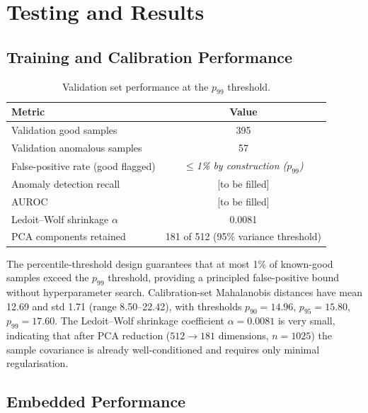 \section{Testing and Results}

\subsection{Training and Calibration Performance}

\begin{table}[h]
\centering
\caption{Validation set performance at the $p_{99}$ threshold.}
\label{tab:val}
\small
\begin{tabular}{lc}
\hline
\textbf{Metric} & \textbf{Value} \\
\hline
Validation good samples       & 395 \\
Validation anomalous samples  & 57 \\
False-positive rate (good flagged) & \textit{$\leq$1\% by construction ($p_{99}$)} \\
Anomaly detection recall      & [to be filled] \\
AUROC                         & [to be filled] \\
Ledoit--Wolf shrinkage $\alpha$ & 0.0081 \\
PCA components retained       & 181 of 512 (95\% variance threshold) \\
\hline
\end{tabular}
\end{table}

The percentile-threshold design guarantees that at most 1\% of known-good
samples exceed the $p_{99}$ threshold, providing a principled false-positive
bound without hyperparameter search. Calibration-set Mahalanobis distances
have mean 12.69 and std 1.71 (range 8.50--22.42), with thresholds
$p_{90}=14.96$, $p_{95}=15.80$, $p_{99}=17.60$. The Ledoit--Wolf shrinkage
coefficient $\alpha=0.0081$ is very small, indicating that after PCA
reduction ($512\rightarrow181$ dimensions, $n=1025$) the sample covariance
is already well-conditioned and requires only minimal regularisation.

\subsection{Embedded Performance}

